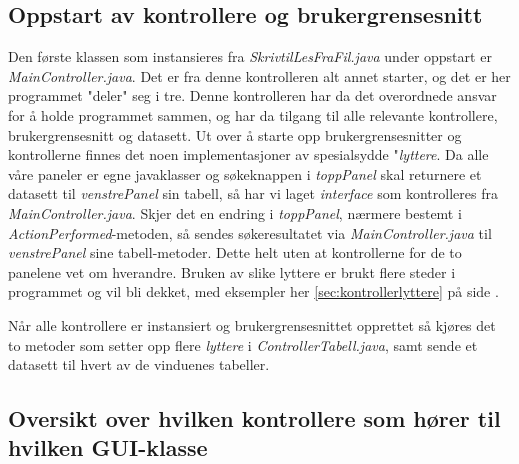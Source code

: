 \subsection{Oppstart av kontrollere og brukergrensesnitt}
Den første klassen som instansieres fra \emph{SkrivtilLesFraFil.java} under oppstart er \emph{MainController.java}.
Det er fra denne kontrolleren alt annet starter, og det er her programmet "deler" seg i tre. 
Denne kontrolleren har da det overordnede ansvar for å holde programmet sammen, og har da tilgang til alle relevante kontrollere, brukergrensesnitt og datasett. 
Ut over å starte opp brukergrensesnitter og kontrollerne finnes det noen implementasjoner av spesialsydde "\emph{lyttere}. 
Da alle våre paneler er egne javaklasser og søkeknappen i \emph{toppPanel} skal returnere et datasett til \emph{venstrePanel} sin tabell, så har vi laget \emph{interface} som kontrolleres fra \emph{MainController.java}. Skjer det en endring i \emph{toppPanel}, nærmere bestemt i \emph{ActionPerformed}-metoden, så sendes søkeresultatet via \emph{MainController.java} til \emph{venstrePanel} sine tabell-metoder. Dette helt uten at kontrollerne for de to panelene vet om hverandre.
Bruken av slike lyttere er brukt flere steder i programmet og vil bli dekket, med eksempler her \ref{sec:kontrollerlyttere} på side \pageref{sec:kontrollerlyttere}.

Når alle kontrollere er instansiert og brukergrensesnittet opprettet så kjøres det to metoder som setter opp flere \emph{lyttere} i \emph{ControllerTabell.java}, samt sende et datasett til hvert av de vinduenes tabeller.



\newpage
\subsection{Oversikt over hvilken kontrollere som hører til hvilken GUI-klasse}


